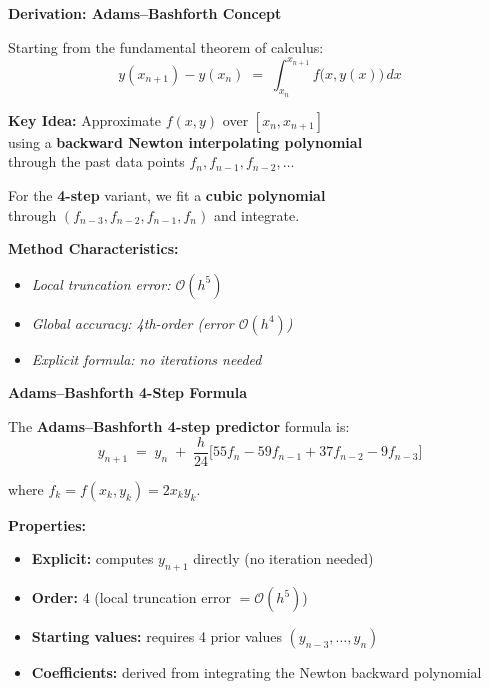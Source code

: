 \documentclass[12pt]{beamer}
\begin{document}
\begin{frame}{\textbf{Derivation: Adams--Bashforth Concept}}
  \begin{center}
    \vfill
    Starting from the fundamental theorem of calculus:
    \[
      y(x_{n+1}) - y(x_n) \;=\; \int_{x_n}^{x_{n+1}} f\bigl(x, y(x)\bigr)\,dx
    \]

    \vspace{1em}
    \textbf{Key Idea:}\; Approximate $f(x, y)$ over $[x_n, x_{n+1}]$\\[0.3em]
    using a \textbf{backward Newton interpolating polynomial}\\[0.3em]
    through the past data points $f_n, f_{n-1}, f_{n-2}, \ldots$

    \vspace{1.5em}
    For the \textbf{4-step} variant, we fit a \textbf{cubic polynomial}\\[0.3em]
    through $(f_{n-3}, f_{n-2}, f_{n-1}, f_n)$ and integrate.

    \vspace{1em}
    \textbf{Method Characteristics:}
    \begin{itemize}
      \item \textit{Local truncation error: $\mathcal{O}(h^5)$}
      \item \textit{Global accuracy: 4th-order (error $\mathcal{O}(h^4)$)}
      \item \textit{Explicit formula: no iterations needed}
    \end{itemize}
    \vfill
  \end{center}
\end{frame}

\begin{frame}{\textbf{Adams--Bashforth 4-Step Formula}}
  \begin{center}
    \vfill
    The \textbf{Adams--Bashforth 4-step predictor} formula is:
    \[
      \boxed{y_{n+1} \;=\; y_n \;+\; \frac{h}{24}\bigl[55f_n - 59f_{n-1} + 37f_{n-2} - 9f_{n-3}\bigr]}
    \]

    \vspace{1em}
    where $f_k = f(x_k, y_k) = 2 x_k y_k$.

    \vspace{1.5em}
    \textbf{Properties:}
    \begin{itemize}
      \item \textbf{Explicit:}\; computes $y_{n+1}$ directly (no iteration needed)
      \item \textbf{Order:}\; $4$ (local truncation error $= \mathcal{O}(h^5)$)
      \item \textbf{Starting values:}\; requires 4 prior values $(y_{n-3}, \ldots, y_n)$
      \item \textbf{Coefficients:}\; derived from integrating the Newton backward polynomial
    \end{itemize}
    \vfill
  \end{center}
\end{frame}
\end{document}
